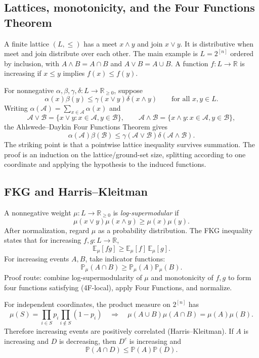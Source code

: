 \documentclass[10pt]{article}
\newcommand{\E}{\mathbb E}
\newcommand{\Prb}{\mathbb P}
\newcommand{\1}{\mathbf 1}
\begin{document}
\subsection{Lattices, monotonicity, and the Four Functions Theorem}

A finite lattice $(L,\leq)$ has a meet $x\wedge y$ and join $x\vee y$.
It is distributive when meet and join distribute over each other.  The main
example is $L=2^{[n]}$ ordered by inclusion, with
$A\wedge B=A\cap B$ and $A\vee B=A\cup B$.
A function $f:L\to\mathbb R$ is increasing if $x\leq y$ implies
$f(x)\leq f(y)$.

For nonnegative $\alpha,\beta,\gamma,\delta:L\to\mathbb R_{\geq0}$, suppose
\[
 \alpha(x)\beta(y)\leq\gamma(x\vee y)\delta(x\wedge y)
 \qquad\text{for all }x,y\in L.                       \tag{4F-local}
\]
Writing $\alpha(\mathcal A)=\sum_{x\in\mathcal A}\alpha(x)$ and
\[
 \mathcal A\vee\mathcal B=\{x\vee y:x\in\mathcal A,y\in\mathcal B\},
 \qquad
 \mathcal A\wedge\mathcal B=\{x\wedge y:x\in\mathcal A,y\in\mathcal B\},
\]
the Ahlswede--Daykin Four Functions Theorem gives
\[
 \alpha(\mathcal A)\beta(\mathcal B)
 \leq\gamma(\mathcal A\vee\mathcal B)
       \delta(\mathcal A\wedge\mathcal B).             \tag{4F-global}
\]
The striking point is that a pointwise lattice inequality survives summation.
The proof is an induction on the lattice/ground-set size, splitting according
to one coordinate and applying the hypothesis to the induced functions.

\subsection{FKG and Harris--Kleitman}

A nonnegative weight $\mu:L\to\mathbb R_{\geq0}$ is
\emph{log-supermodular} if
\[
 \mu(x\vee y)\mu(x\wedge y)\geq\mu(x)\mu(y).
\]
After normalization, regard $\mu$ as a probability distribution.  The FKG
inequality states that for increasing $f,g:L\to\mathbb R$,
\[
 \E_\mu[fg]\geq\E_\mu[f]\,\E_\mu[g].                  \tag{FKG}
\]
For increasing events $A,B$, take indicator functions:
\[
 \Prb_\mu(A\cap B)\geq\Prb_\mu(A)\Prb_\mu(B).
\]
Proof route: combine log-supermodularity of $\mu$ and monotonicity of $f,g$ to
form four functions satisfying (4F-local), apply Four Functions, and normalize.

For independent coordinates, the product measure on $2^{[n]}$ has
\[
 \mu(S)=\prod_{i\in S}p_i\prod_{i\notin S}(1-p_i)
\quad\Longrightarrow\quad
\mu(A\cup B)\mu(A\cap B)=\mu(A)\mu(B).
\]
Therefore increasing events are positively correlated (Harris--Kleitman).
If $A$ is increasing and $D$ is decreasing, then $D^c$ is increasing and
\[
 \Prb(A\cap D)\leq\Prb(A)\Prb(D).
\]
\end{document}
